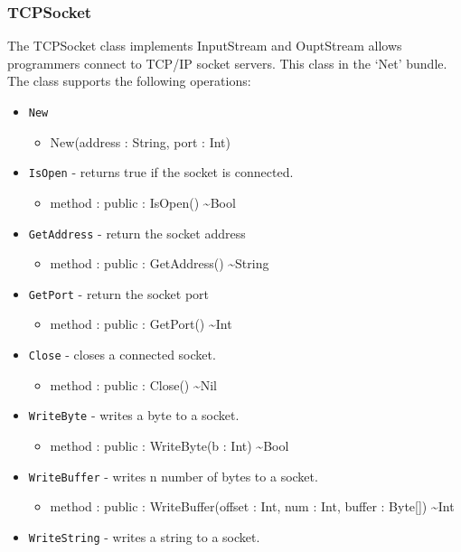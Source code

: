 \documentclass[11pt]{article}
\begin{document}
\subsubsection{TCPSocket}
The TCPSocket class implements InputStream and OuptStream allows programmers connect to TCP/IP socket
servers.  This class in the `Net' bundle.  The class supports the
following operations:
\begin{itemize}
\item \texttt{New}
  \begin{itemize}
  \item New(address : String, port : Int)
  \end{itemize}
\item \texttt{IsOpen} - returns true if the socket is connected.
  \begin{itemize}
  \item method : public : IsOpen() \textasciitilde Bool
  \end{itemize}
\item \texttt{GetAddress} - return the socket address
  \begin{itemize}
  \item method : public : GetAddress() \textasciitilde String
  \end{itemize}
\item \texttt{GetPort} - return the socket port
  \begin{itemize}
  \item method : public : GetPort() \textasciitilde Int
  \end{itemize}
\item \texttt{Close} - closes a connected socket.
  \begin{itemize}
  \item method : public : Close() \textasciitilde Nil
  \end{itemize}
\item \texttt{WriteByte} - writes a byte to a socket.
  \begin{itemize}
  \item method : public : WriteByte(b : Int) \textasciitilde Bool
  \end{itemize}
\item \texttt{WriteBuffer} - writes n number of bytes to a socket.
  \begin{itemize}
  \item method : public : WriteBuffer(offset : Int, num : Int, buffer
    : Byte[]) \textasciitilde Int
  \end{itemize}
\item \texttt{WriteString} - writes a string to a socket.

\end{itemize}
\end{document}
